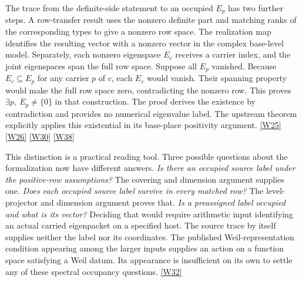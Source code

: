 \documentclass[12pt,letterpaper]{article}
\begin{document}
The trace from the definite-side statement to an occupied \(E_p\) has two further steps. A row-transfer result uses the nonzero definite part and matching ranks of the corresponding types to give a nonzero row space. The realization map identifies the resulting vector with a nonzero vector in the complex base-level model. Separately, each nonzero eigenspace \(E_c\) receives a carrier index, and the joint eigenspaces span the full row space. Suppose all \(E_p\) vanished. Because \(E_c\subseteq E_p\) for any carrier \(p\) of \(c\), each \(E_c\) would vanish. Their spanning property would make the full row space zero, contradicting the nonzero row. This proves \(\exists p,\ E_p\ne\{0\}\) in that construction. The proof derives the existence by contradiction and provides no numerical eigenvalue label. The upstream theorem explicitly applies this existential in its base-place positivity argument. \href{https://github.com/nousentllc/riemann-hypothesis/blob/40e56bab026552e089d7afcfeff08d2defb9c005/src/Development/AbelianVarietyTheory/Proofs/IwasawaDecomposition/ExistsRowPartNeBotPositiveDimension.lean#L90-L115}{\textsf{[W25]}} \href{https://github.com/nousentllc/riemann-hypothesis/blob/40e56bab026552e089d7afcfeff08d2defb9c005/src/Development/AutomorphicArithmetic/ThetaCorrespondence/ThetaPairLifts/LocalTypeDictionary/HoldsLOfTies.lean#L23-L49}{\textsf{[W26]}} \href{https://github.com/nousentllc/riemann-hypothesis/blob/40e56bab026552e089d7afcfeff08d2defb9c005/src/Development/AbelianVarietyTheory/Proofs/TwistedOperators/ExistsUnitaryRep.lean#L116-L123}{\textsf{[W30]}} \href{https://github.com/nousentllc/riemann-hypothesis/blob/40e56bab026552e089d7afcfeff08d2defb9c005/src/Development/AbelianVarietyTheory/Proofs/TwistedOperators/ExistsPart.lean#L95-L116}{\textsf{[W38]}}

This distinction is a practical reading tool. Three possible questions about the formalization now have different answers. \emph{Is there an occupied source label under the positive-row assumptions?} The covering and dimension argument supplies one. \emph{Does each occupied source label survive in every matched row?} The level-projector and dimension argument proves that. \emph{Is a preassigned label occupied and what is its vector?} Deciding that would require arithmetic input identifying an actual carried eigenpacket on a specified host. The source trace by itself supplies neither the label nor its coordinates. The published Weil-representation condition appearing among the larger inputs supplies an action on a function space satisfying a Weil datum. Its appearance is insufficient on its own to settle any of these spectral occupancy questions. \href{https://github.com/nousentllc/riemann-hypothesis/blob/40e56bab026552e089d7afcfeff08d2defb9c005/src/Development/AbelianVarietyTheory/PublishedTheorems/AutomorphicForms%E2%82%82/WeilRepresentationUnitaryPair.lean#L12-L15}{\textsf{[W32]}}
\end{document}

